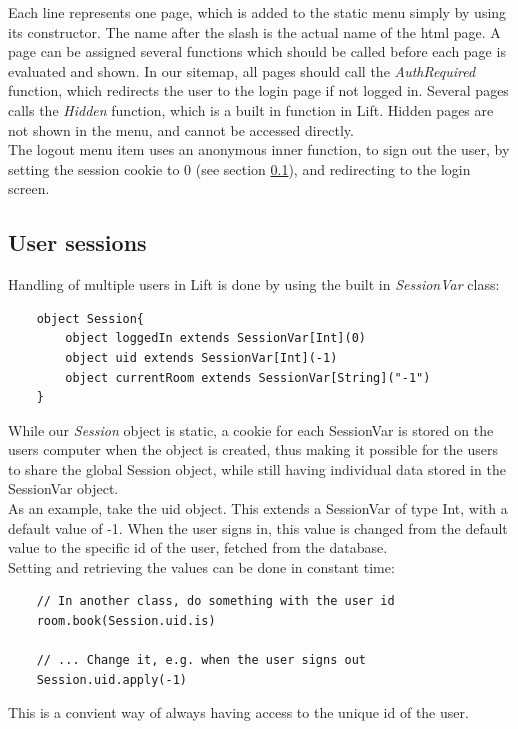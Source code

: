 Each line represents one page, which is added to the static menu simply by using its constructor. The name after the slash is the actual name of the html page. A page can be assigned several functions which should be called before each page is evaluated and shown. In our sitemap, all pages should call the \emph{AuthRequired} function, which redirects the user to the login page if not logged in. Several pages calls the \emph{Hidden} function, which is a built in function in Lift. Hidden pages are not shown in the menu, and cannot be accessed directly. \\
The logout menu item uses an anonymous inner function, to sign out the user, by setting the session cookie to 0 (see section \ref{sub:sessions}), and redirecting to the login screen.\\

\subsection{User sessions}
\label{sub:sessions}
Handling of multiple users in Lift is done by using the built in \emph{SessionVar} class:

\begin{verbatim}
    object Session{
        object loggedIn extends SessionVar[Int](0)
        object uid extends SessionVar[Int](-1)
        object currentRoom extends SessionVar[String]("-1")
    }
\end{verbatim}

While our \emph{Session} object is static, a cookie for each SessionVar is stored on the users computer when the object is created, thus making it possible for the users to share the global Session object, while still having individual data stored in the SessionVar object. \\
As an example, take the uid object. This extends a SessionVar of type Int, with a default value of -1. When the user signs in, this value is changed from the default value to the specific id of the user, fetched from the database.\\

Setting and retrieving the values can be done in constant time:
\begin{verbatim}
	// In another class, do something with the user id
	room.book(Session.uid.is)
	
	// ... Change it, e.g. when the user signs out
	Session.uid.apply(-1)
\end{verbatim}
This is a convient way of always having access to the unique id of the user.

